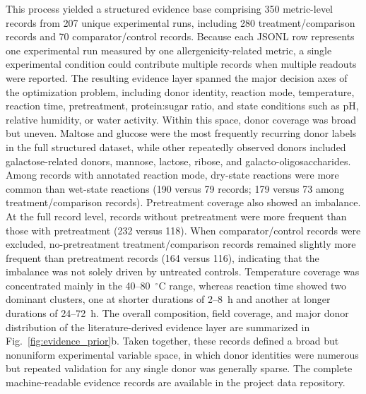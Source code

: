 This process yielded a structured evidence base comprising 350 metric-level records from 207 unique experimental runs, including 280 treatment/comparison records and 70 comparator/control records. Because each JSONL row represents one experimental run measured by one allergenicity-related metric, a single experimental condition could contribute multiple records when multiple readouts were reported. The resulting evidence layer spanned the major decision axes of the optimization problem, including donor identity, reaction mode, temperature, reaction time, pretreatment, protein:sugar ratio, and state conditions such as pH, relative humidity, or water activity. Within this space, donor coverage was broad but uneven. Maltose and glucose were the most frequently recurring donor labels in the full structured dataset, while other repeatedly observed donors included galactose-related donors, mannose, lactose, ribose, and galacto-oligosaccharides. Among records with annotated reaction mode, dry-state reactions were more common than wet-state reactions (190 versus 79 records; 179 versus 73 among treatment/comparison records). Pretreatment coverage also showed an imbalance. At the full record level, records without pretreatment were more frequent than those with pretreatment (232 versus 118). When comparator/control records were excluded, no-pretreatment treatment/comparison records remained slightly more frequent than pretreatment records (164 versus 116), indicating that the imbalance was not solely driven by untreated controls. Temperature coverage was concentrated mainly in the 40--80~$^\circ$C range, whereas reaction time showed two dominant clusters, one at shorter durations of 2--8~h and another at longer durations of 24--72~h. The overall composition, field coverage, and major donor distribution of the literature-derived evidence layer are summarized in Fig.~\ref{fig:evidence_prior}b. Taken together, these records defined a broad but nonuniform experimental variable space, in which donor identities were numerous but repeated validation for any single donor was generally sparse.
The complete machine-readable evidence records are available in the project data repository.

